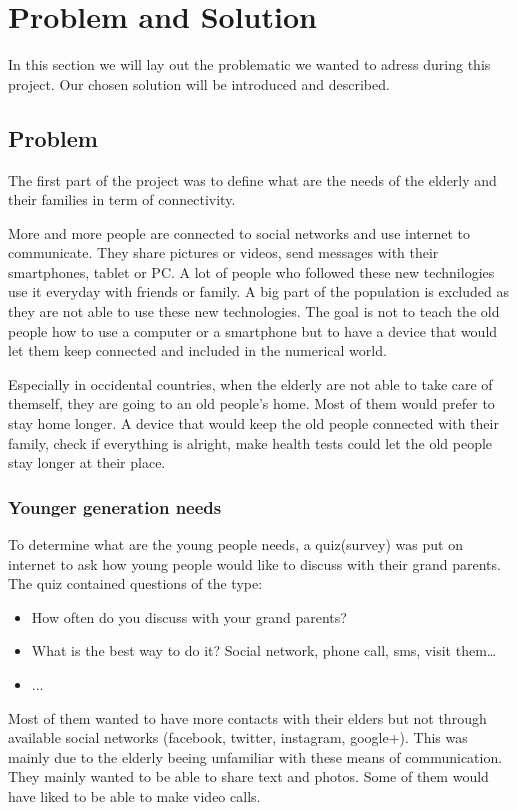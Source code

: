 \section{Problem and Solution}
In this section we will lay out the problematic we wanted to adress during this project. Our chosen solution will be introduced and described.
\subsection{Problem}
The first part of the project was to define what are the needs of the elderly and their families in term of connectivity.

More and more people are connected to social networks and use internet to communicate. They share pictures or videos, send messages with their smartphones, tablet or PC. A lot of people who followed these new technilogies use it everyday with friends or family. A big part of the population is excluded as they are not able to use these new technologies. The goal is not to teach the old people how to use a computer or a smartphone but to have a device that would let them keep connected and included in the numerical world.

Especially in occidental countries, when the elderly are not able to take care of themself, they are going to an old people's home. Most of them would prefer to stay home longer. A device that would keep the old people connected with their family, check if everything is alright, make health tests could let the old people stay longer at their place.
\subsubsection{Younger generation needs}
To determine what are the young people needs, a quiz(survey) was put on internet to ask how young people would like to discuss with their grand parents.
The quiz contained questions of the type:
\begin{itemize}
\item{How often do you discuss with your grand parents?}
\item{What is the best way to do it? Social network, phone call, sms, visit them…}
\item{...}
\end{itemize}

Most of them wanted to have more contacts with their elders but not through available social networks (facebook, twitter, instagram, google+). This was mainly
due to the elderly beeing unfamiliar with these means of communication.
They mainly wanted to be able to share text and photos. Some of them would have liked to be able to make video calls.
